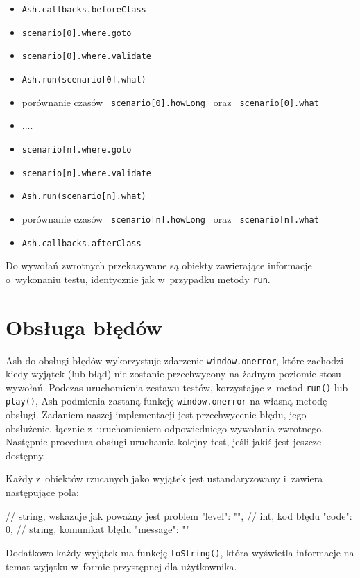 \documentclass{xmgr}
\begin{document}
\begin{itemize}
  \item \texttt{Ash.callbacks.beforeClass }
  \item \texttt{scenario[0].where.goto }
  \item \texttt{scenario[0].where.validate }
  \item \texttt{Ash.run(scenario[0].what) }
  \item  porównanie czasów \texttt{ scenario[0].howLong } oraz \texttt{ scenario[0].what }
  \item  ....
  \item \texttt{scenario[n].where.goto }
  \item \texttt{scenario[n].where.validate }
  \item \texttt{Ash.run(scenario[n].what) }
  \item  porównanie czasów \texttt{ scenario[n].howLong } oraz \texttt{ scenario[n].what }
  \item \texttt{Ash.callbacks.afterClass }
\end{itemize}

Do wywołań zwrotnych przekazywane są obiekty zawierające informacje o~wykonaniu testu, identycznie jak w~przypadku metody \texttt{run}.

\section{Obsługa błędów}

Ash do obsługi błędów wykorzystuje zdarzenie \texttt{window.onerror}, które zachodzi kiedy wyjątek (lub błąd) nie zostanie przechwycony na żadnym poziomie stosu wywołań. Podczas uruchomienia zestawu testów, korzystając z~metod \texttt{run()} lub \texttt{play()}, Ash podmienia zastaną funkcję \texttt{window.onerror} na własną metodę obsługi. Zadaniem naszej implementacji jest przechwycenie błędu, jego obsłużenie, łącznie z~uruchomieniem odpowiedniego wywołania zwrotnego. Następnie procedura obsługi uruchamia kolejny test, jeśli jakiś jest jeszcze dostępny. 

Każdy z~obiektów rzucanych jako wyjątek jest ustandaryzowany i~zawiera następujące pola: 
\begin{javascriptcode}
	{
		// string, wskazuje jak poważny jest problem
		"level": "",
		// int, kod błędu 
		"code": 0, 
		// string, komunikat błędu
		"message": ""
	}
\end{javascriptcode}
Dodatkowo każdy wyjątek ma funkcję \texttt{toString()}, która wyświetla informacje na temat wyjątku w~formie przystępnej dla użytkownika.
\end{document}

